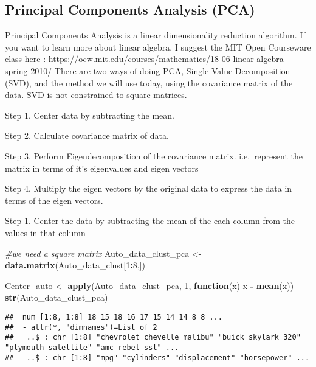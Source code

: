\documentclass[11pt,]{article}
\newenvironment{Shaded}{\begin{snugshade}}{\end{snugshade}}
\newcommand{\CommentTok}[1]{\textcolor[rgb]{0.56,0.35,0.01}{\textit{#1}}}
\newcommand{\ControlFlowTok}[1]{\textcolor[rgb]{0.13,0.29,0.53}{\textbf{#1}}}
\newcommand{\DecValTok}[1]{\textcolor[rgb]{0.00,0.00,0.81}{#1}}
\newcommand{\KeywordTok}[1]{\textcolor[rgb]{0.13,0.29,0.53}{\textbf{#1}}}
\newcommand{\NormalTok}[1]{#1}
\newcommand{\OperatorTok}[1]{\textcolor[rgb]{0.81,0.36,0.00}{\textbf{#1}}}
\newcommand{\StringTok}[1]{\textcolor[rgb]{0.31,0.60,0.02}{#1}}
\begin{document}
\newpage

\hypertarget{principal-components-analysis-pca}{%
\subsection{Principal Components Analysis
(PCA)}\label{principal-components-analysis-pca}}

Principal Components Analysis is a linear dimensionality reduction
algorithm. If you want to learn more about linear algebra, I suggest the
MIT Open Courseware class here :
\url{https://ocw.mit.edu/courses/mathematics/18-06-linear-algebra-spring-2010/}
There are two ways of doing PCA, Single Value Decomposition (SVD), and
the method we will use today, using the covariance matrix of the data.
SVD is not constrained to square matrices.

Step 1. Center data by subtracting the mean.

Step 2. Calculate covariance matrix of data.

Step 3. Perform Eigendecomposition of the covariance matrix.
i.e.~represent the matrix in terms of it's eigenvalues and eigen vectors

Step 4. Multiply the eigen vectors by the original data to express the
data in terms of the eigen vectors.

Step 1. Center the data by subtracting the mean of the each column from
the values in that column

\begin{Shaded}
\begin{Highlighting}[]
\CommentTok{#we need a square matrix}
\NormalTok{Auto_data_clust_pca <-}\StringTok{ }\KeywordTok{data.matrix}\NormalTok{(Auto_data_clust[}\DecValTok{1}\OperatorTok{:}\DecValTok{8}\NormalTok{,])}

\NormalTok{Center_auto <-}\StringTok{ }\KeywordTok{apply}\NormalTok{(Auto_data_clust_pca, }\DecValTok{1}\NormalTok{, }\ControlFlowTok{function}\NormalTok{(x) x }\OperatorTok{-}\StringTok{ }\KeywordTok{mean}\NormalTok{(x))}
\KeywordTok{str}\NormalTok{(Auto_data_clust_pca)}
\end{Highlighting}
\end{Shaded}

\begin{verbatim}
##  num [1:8, 1:8] 18 15 18 16 17 15 14 14 8 8 ...
##  - attr(*, "dimnames")=List of 2
##   ..$ : chr [1:8] "chevrolet chevelle malibu" "buick skylark 320" "plymouth satellite" "amc rebel sst" ...
##   ..$ : chr [1:8] "mpg" "cylinders" "displacement" "horsepower" ...
\end{verbatim}
\end{document}
